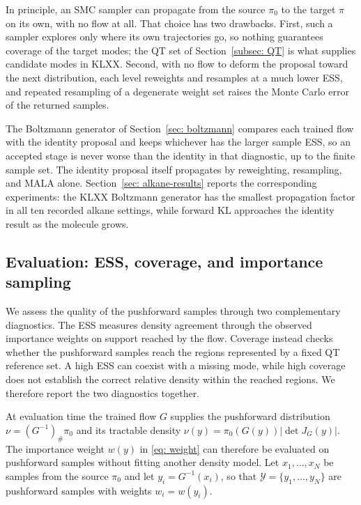 \documentclass{article}
\begin{document}
\begin{remark}
	In principle, an SMC sampler can propagate from the source $\pi_0$ to the target $\pi$ on its own, with no flow at all. That choice has two drawbacks. First, such a sampler explores only where its own trajectories go, so nothing guarantees coverage of the target modes; the QT set of Section~\ref{subsec: QT} is what supplies candidate modes in KLXX. Second, with no flow to deform the proposal toward the next distribution, each level reweights and resamples at a much lower ESS, and repeated resampling of a degenerate weight set raises the Monte Carlo error of the returned samples.
	
	The Boltzmann generator of Section~\ref{sec: boltzmann} compares each trained flow with the identity proposal and keeps whichever has the larger sample ESS, so an accepted stage is never worse than the identity in that diagnostic, up to the finite sample set. The identity proposal itself propagates by reweighting, resampling, and MALA alone. Section~\ref{sec: alkane-results} reports the corresponding experiments: the KLXX Boltzmann generator has the smallest propagation factor in all ten recorded alkane settings, while forward KL approaches the identity result as the molecule grows.
\end{remark}

\subsection{Evaluation: ESS, coverage, and importance sampling}
\label{subsec: eval}

We assess the quality of the pushforward samples through two complementary diagnostics. The ESS measures density agreement through the observed importance weights on support reached by the flow. Coverage instead checks whether the pushforward samples reach the regions represented by a fixed QT reference set. A high ESS can coexist with a missing mode, while high coverage does not establish the correct relative density within the reached regions. We therefore report the two diagnostics together.

At evaluation time the trained flow $G$ supplies the pushforward distribution $\nu=(G^{-1})_{\#}\pi_0$ and its tractable density $\nu(y)=\pi_0(G(y))|\det J_G(y)|$. The importance weight $w(y)$ in \eqref{eq: weight} can therefore be evaluated on pushforward samples without fitting another density model. Let $x_1,\dots,x_N$ be samples from the source $\pi_0$ and let $y_i = G^{-1}(x_i)$, so that $\mathcal Y=\{y_1,\dots,y_N\}$ are pushforward samples with weights $w_i=w(y_i)$.
\end{document}
